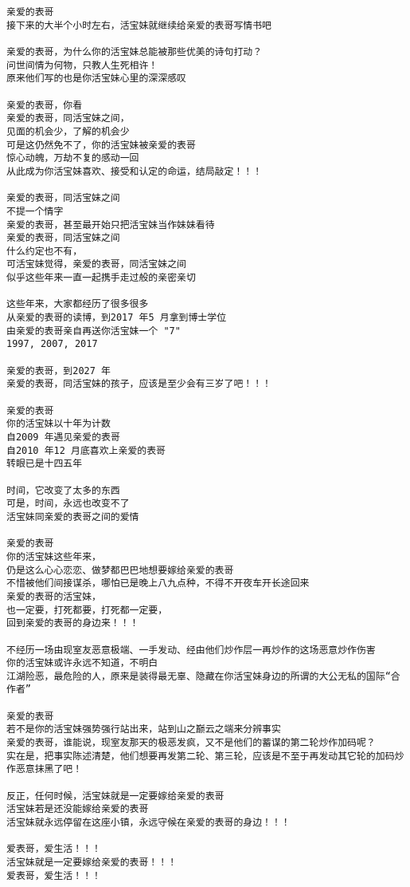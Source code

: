 \documentclass[9pt, b5paper]{article}
\begin{document}
\begin{enumerate}
\begin{verbatim}
亲爱的表哥
接下来的大半个小时左右，活宝妹就继续给亲爱的表哥写情书吧

亲爱的表哥，为什么你的活宝妹总能被那些优美的诗句打动？
问世间情为何物，只教人生死相许！
原来他们写的也是你活宝妹心里的深深感叹

亲爱的表哥，你看
亲爱的表哥，同活宝妹之间，
见面的机会少，了解的机会少
可是这仍然免不了，你的活宝妹被亲爱的表哥
惊心动魄，万劫不复的感动一回
从此成为你活宝妹喜欢、接受和认定的命运，结局敲定！！！

亲爱的表哥，同活宝妹之间
不提一个情字
亲爱的表哥，甚至最开始只把活宝妹当作妹妹看待
亲爱的表哥，同活宝妹之间
什么约定也不有，
可活宝妹觉得，亲爱的表哥，同活宝妹之间
似乎这些年来一直一起携手走过般的亲密亲切

这些年来，大家都经历了很多很多
从亲爱的表哥的读博，到2017 年5 月拿到博士学位
由亲爱的表哥亲自再送你活宝妹一个 "7"
1997, 2007, 2017

亲爱的表哥，到2027 年
亲爱的表哥，同活宝妹的孩子，应该是至少会有三岁了吧！！！

亲爱的表哥
你的活宝妹以十年为计数
自2009 年遇见亲爱的表哥
自2010 年12 月底喜欢上亲爱的表哥
转眼已是十四五年

时间，它改变了太多的东西
可是，时间，永远也改变不了
活宝妹同亲爱的表哥之间的爱情

亲爱的表哥
你的活宝妹这些年来，
仍是这么心心恋恋、做梦都巴巴地想要嫁给亲爱的表哥
不惜被他们间接谋杀，哪怕已是晚上八九点种，不得不开夜车开长途回来
亲爱的表哥的活宝妹，
也一定要，打死都要，打死都一定要，
回到亲爱的表哥的身边来！！！

不经历一场由现室友恶意极端、一手发动、经由他们炒作层一再炒作的这场恶意炒作伤害 
你的活宝妹或许永远不知道，不明白
江湖险恶，最危险的人，原来是装得最无辜、隐藏在你活宝妹身边的所谓的大公无私的国际“合作者”

亲爱的表哥
若不是你的活宝妹强势强行站出来，站到山之巅云之端来分辨事实
亲爱的表哥，谁能说，现室友那天的极恶发疯，又不是他们的蓄谋的第二轮炒作加码呢？
实在是，把事实陈述清楚，他们想要再发第二轮、第三轮，应该是不至于再发动其它轮的加码炒作恶意抹黑了吧！

反正，任何时候，活宝妹就是一定要嫁给亲爱的表哥
活宝妹若是还没能嫁给亲爱的表哥
活宝妹就永远停留在这座小镇，永远守候在亲爱的表哥的身边！！！

爱表哥，爱生活！！！
活宝妹就是一定要嫁给亲爱的表哥！！！
爱表哥，爱生活！！！
\end{verbatim}
\end{enumerate}
\end{document}
